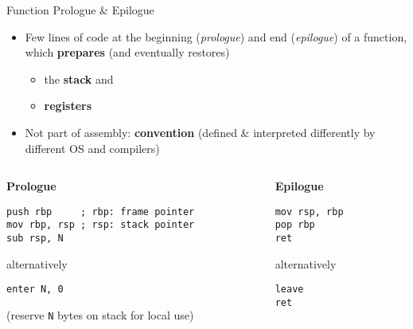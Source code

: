 \begin{frame}[fragile]{Function Prologue \& Epilogue}
    \begin{itemize}
        \item Few lines of code at the beginning (\textit{prologue}) and end (\textit{epilogue}) of a function, which \textbf{prepares} (and eventually restores)
        \begin{itemize}
            \item the \textbf{stack} and 
            \item \textbf{registers}
        \end{itemize}
        \item Not part of assembly: \textbf{convention} (defined \& interpreted differently by different OS and compilers)
    \end{itemize}

    \begin{columns}[t]
        \begin{column}{.45\textwidth}
            \textbf{Prologue}
            \begin{lstlisting}[language={}]
push rbp     ; rbp: frame pointer
mov rbp, rsp ; rsp: stack pointer
sub rsp, N
            \end{lstlisting}
            alternatively
            \begin{lstlisting}[language={}]
enter N, 0
            \end{lstlisting}
            (reserve \texttt{N} bytes on stack for local use)
        \end{column}
        \begin{column}{.45\textwidth}
            \textbf{Epilogue}
            \begin{lstlisting}[language={}]
mov rsp, rbp
pop rbp
ret
            \end{lstlisting}
            alternatively
            \begin{lstlisting}[language={}]
leave
ret
            \end{lstlisting}
        \end{column}
    \end{columns}
\end{frame}

